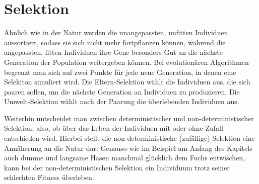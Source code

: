 



\section{Selektion}
Ähnlich wie in der Natur werden die unangepassten, unfitten Individuen aussortiert, sodass sie sich nicht mehr fortpflanzen können, während die angepassten, fitten Individuen ihre Gene besonders Gut an die nächste Generation der Population weitergeben können. Bei evolutionären Algorithmen begrenzt man sich auf zwei Punkte für jede neue Generation, in denen eine Selekiton simuliert wird. 
Die Eltern-Selektion wählt die Individuen aus, die sich paaren sollen, um die nächste Generation an Individuen zu produzieren. Die Umwelt-Selektion wählt nach der Paarung die überlebenden Individuen aus. 

Weiterhin untscheidet man zwischen deterministischer und non-deterministischer Selektion, also, ob über das Leben der Individuen mit oder ohne Zufall entschieden wird. Hierbei stellt die non-deterministische (zufällige) Selektion eine Annäherung an die Natur dar: Genauso wie im Beispiel am Anfang des Kapitels auch dumme und langsame Hasen manchmal glücklich dem Fuchs entwischen, kann bei der non-deterministischen Selektion ein Individuum trotz seiner schlechten Fitness überleben. 

